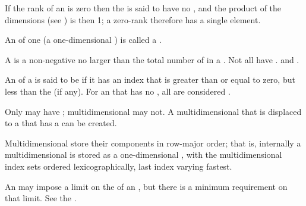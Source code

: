 If the rank of an  is zero then the  is said to have
no , and the product of the dimensions (see )
is then 1; a zero-rank  therefore has a single element.


An  of  one (\ie a one-dimensional )
is called a .


A  is a non-negative  no
larger than the total number of  in a .
Not all  have .
 and .

An  of a  is said to be  if it has
an index that is greater than or equal to zero, 
but less than the  (if any).
For an  that has no ,
all  are considered .

Only  may have ; 
multidimensional  may not.
A multidimensional  that is displaced to a  
that has a  can be created.

\endsubsubsubsubsection%

\endsubsubsubsection%



Multidimensional  store their components in row-major order;
that is, internally a multidimensional  is stored as a
one-dimensional , with the multidimensional index sets
ordered lexicographically, last index varying fastest.  
 
\endsubsubsubsubsection%


An  may impose a limit on the  of an ,
but there is a minimum requirement on that limit.  See the
 .

\endsubsubsubsubsection%

